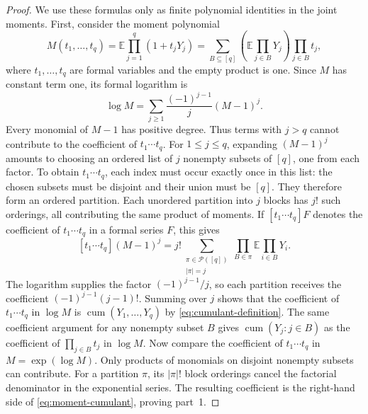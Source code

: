 \documentclass[11pt]{article}
\theoremstyle{definition}
\theoremstyle{remark}
\theoremstyle{plain}
\newcommand{\E}{\mathbb E}
\DeclareMathOperator{\cum}{cum}
\begin{document}
\begin{proof}
We use these formulas only as finite polynomial identities in the
joint moments. First, consider the moment polynomial
\[
 M(t_1,\ldots,t_q)
    =\E\prod_{j=1}^q(1+t_jY_j)
    =\sum_{B\subseteq[q]}\left(\E\prod_{j\in B}Y_j\right)
                         \prod_{j\in B}t_j,
\]
where $t_1,\ldots,t_q$ are formal variables and the empty product
is one. Since $M$ has constant term one, its formal logarithm is
\[
 \log M=\sum_{j\ge1}\frac{(-1)^{j-1}}{j}(M-1)^j.
\]
Every monomial of $M-1$ has positive degree. Thus terms with
$j>q$ cannot contribute to the coefficient of $t_1\cdots t_q$.
For $1\le j\le q$, expanding $(M-1)^j$ amounts to choosing
an ordered list of $j$ nonempty subsets of $[q]$, one from each
factor. To obtain $t_1\cdots t_q$, each index must occur exactly
once in this list: the chosen subsets must be disjoint and their
union must be $[q]$. They therefore form an ordered partition.
Each unordered partition into $j$ blocks has $j!$ such orderings,
all contributing the same product of moments. If
$[t_1\cdots t_q]F$ denotes the coefficient of $t_1\cdots t_q$
in a formal series $F$, this gives
\[
 [t_1\cdots t_q](M-1)^j
   =j!\sum_{\substack{\pi\in\mathcal P([q])\\|\pi|=j}}
          \prod_{B\in\pi}\E\prod_{i\in B}Y_i.
\]
The logarithm supplies the factor $(-1)^{j-1}/j$, so each
partition receives the coefficient $(-1)^{j-1}(j-1)!$.
Summing over $j$ shows that the coefficient of $t_1\cdots t_q$
in $\log M$ is $\cum(Y_1,\ldots,Y_q)$ by
\eqref{eq:cumulant-definition}.
The same coefficient argument for any nonempty subset $B$ gives
$\cum(Y_j:j\in B)$ as the coefficient of $\prod_{j\in B}t_j$
in $\log M$. Now compare the coefficient of $t_1\cdots t_q$
in $M=\exp(\log M)$. Only products of monomials on disjoint
nonempty subsets can contribute. For a partition $\pi$, its
$|\pi|!$ block orderings cancel the factorial denominator in
the exponential series. The resulting coefficient is the
right-hand side of \eqref{eq:moment-cumulant}, proving part~1.


\end{proof}
\end{document}

